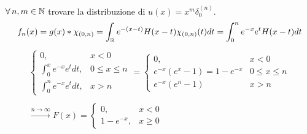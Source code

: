 $\forall n,m\in \NN $ trovare la distribuzione di $u( x) =x^{m} \delta ^{( n)}_{0}$.
\Soluzione
\begin{equation*}
f_{n} (x)=g(x)*\chi _{(0,n)} =\int _{\mathbb{R} } e^{-(x-t)} H(x-t)\chi _{(0,n)} (t)dt=\int ^{n}_{0} e^{-x} e^{t} H(x-t)dt
\end{equation*}
\begin{gather*}
\begin{cases}
0, & x< 0\\
\int ^{x}_{0} e^{-x} e^{t} dt, & 0\leqslant x\leqslant n\\
\int ^{n}_{0} e^{-x} e^{t} dt, & x >n
\end{cases} =\begin{cases}
0, & x< 0\\
e^{-x}\left( e^{x} -1\right) =1-e^{-x} & 0\leqslant x\leqslant n\\
e^{-x} (e^{n} -1) & x >n
\end{cases}\\
\\
\xrightarrow{n\rightarrow \infty } F( x) =\begin{cases}
0, & x< 0\\
1-e^{-x} , & x\geqslant 0
\end{cases}
\end{gather*}
